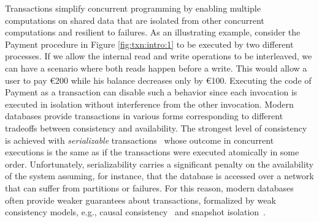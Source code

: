 \begin{figure}
\end{figure}

Transactions simplify concurrent programming by enabling multiple computations on shared data that are isolated from other concurrent computations and resilient to failures.
As an illustrating example, consider the \textsf{Payment} procedure in Figure \ref{fig:txn:intro:1} to be executed by two different processes. If we allow the internal read and write operations to be interleaved, we can have a scenario where both reads happen before a write. This would allow a user to pay €200 while his balance decreases only by €100. Executing the code of \textsf{Payment} as a transaction can disable such a behavior since each invocation is executed in isolation without interference from the other invocation. 
Modern databases provide transactions in various forms corresponding to different tradeoffs between consistency and availability. The strongest level of consistency is achieved with \emph{serializable} transactions~\cite{DBLP:journals/jacm/Papadimitriou79b} whose outcome in concurrent executions is the same as if the transactions were executed atomically in some order. Unfortunately, serializability carries a significant penalty on the availability of the system assuming, for instance, that the database is accessed over a network that can suffer from partitions or failures. For this reason, modern databases often provide weaker guarantees about transactions, formalized by weak consistency models, e.g., causal consistency~\cite{DBLP:journals/cacm/Lamport78} and snapshot isolation~\cite{DBLP:conf/sigmod/BerensonBGMOO95}.

